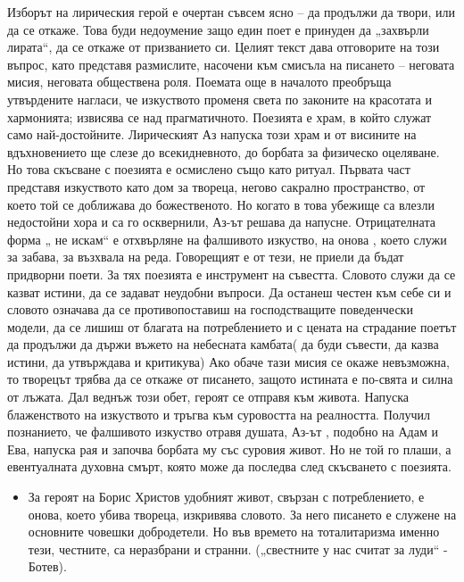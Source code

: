 \documentclass[12pt,a4paper]{article}
\begin{document}
\indent Изборът на лирическия герой е очертан съвсем ясно – да продължи да твори, или да се откаже. Това буди недоумение защо един поет е принуден да „захвърли лирата“, да се откаже от призванието си. Целият текст дава отговорите на този въпрос, като представя размислите, насочени към смисъла на писането – неговата мисия, неговата обществена роля.
Поемата още в началото преобръща утвърдените нагласи, че изкуството променя света по законите на красотата и хармонията; извисява се над прагматичното. Поезията е храм, в който служат само най-достойните. Лирическият Аз напуска този храм  и от висините на вдъхновението ще слезе до всекидневното, до борбата за физическо оцеляване.  Но това скъсване с поезията е осмислено също като ритуал. Първата част представя изкуството като дом за твореца, негово сакрално пространство, от което той се доближава до божественото. Но когато в това убежище са влезли недостойни хора и са го осквернили, Аз-ът решава да напусне. Отрицателната форма „ не искам“  е отхвърляне на фалшивото изкуство, на онова , което служи за забава, за възхвала на реда. Говорещият е от тези, не приели да бъдат придворни поети. За тях поезията е инструмент на съвестта.  Словото служи да се казват истини, да се задават неудобни въпроси. Да останеш честен към себе си и словото означава да  се противопоставиш на господстващите поведенчески модели, да се лишиш от благата на потреблението и с цената на страдание поетът да продължи да държи въжето на небесната камбата( да буди съвести, да казва истини, да утвърждава и критикува) Ако обаче тази мисия се окаже невъзможна, то творецът трябва да се откаже от писането, защото истината е по-свята и силна от лъжата. Дал веднъж този обет, героят се отправя към живота. Напуска блаженството на изкуството и тръгва към суровостта на реалността. Получил познанието, че фалшивото изкуство отравя душата, Аз-ът , подобно на Адам и Ева, напуска рая и започва борбата му със суровия живот. Но не той го плаши, а евентуалната духовна смърт, която може да последва след скъсването с поезията.

\begin{itemize}[leftmargin=*]
\vspace{-0.2cm}
\item За героят на Борис Христов удобният живот, свързан с потреблението, е онова, което убива твореца, изкривява словото. За него писането е служене на основните човешки добродетели. Но във времето на тоталитаризма именно тези, честните, са неразбрани и странни. („свестните у нас считат за луди“ - Ботев).
\end{itemize}
\end{document}

